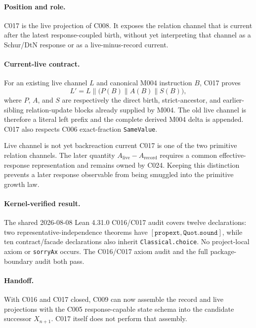 
\paragraph*{Position and role.}
C017 is the live projection of C008.  It exposes the relation channel that is
current after the latest response-coupled birth, without yet interpreting that
channel as a Schur/DtN response or as a live-minus-record current.

\paragraph*{Current-live contract.}
For an existing live channel $L$ and canonical M004 instruction $B$, C017 proves
\[
  L' = L\mathbin{\|}\bigl(P(B)\mathbin{\|}A(B)\mathbin{\|}S(B)\bigr),
\]
where $P$, $A$, and $S$ are respectively the direct birth, strict-ancestor, and
earlier-sibling relation-update blocks already supplied by M004.  The old live
channel is therefore a literal left prefix and the complete derived M004 delta
is appended.  C017 also respects C006 exact-fraction \texttt{SameValue}.

\begin{cnnaInfoBox}{Live channel is not yet backreaction current}
C017 is one of the two primitive relation channels.  The later quantity
$A_{\mathrm{live}}-A_{\mathrm{record}}$ requires a common effective-response
representation and remains owned by C024.  Keeping this distinction prevents a
later response observable from being smuggled into the primitive growth law.
\end{cnnaInfoBox}

\paragraph*{Kernel-verified result.}
The shared 2026-08-08 Lean 4.31.0 C016/C017 audit covers twelve declarations:
two representative-independence theorems have
$[\texttt{propext},\texttt{Quot.sound}]$, while ten contract/facade declarations
also inherit \texttt{Classical.choice}.  No project-local axiom or
\texttt{sorryAx} occurs.  The C016/C017 axiom audit and the full package-boundary
audit both pass.

\paragraph*{Handoff.}
With C016 and C017 closed, C009 can now assemble the record and live projections
with the C005 response-capable state schema into the candidate successor
$X_{n+1}$.  C017 itself does not perform that assembly.
